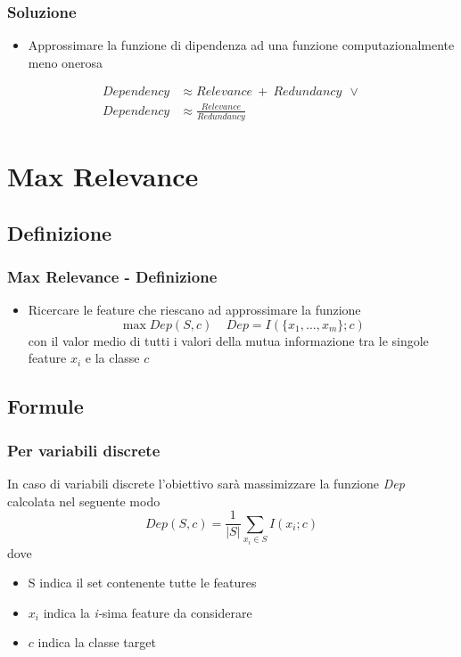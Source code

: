 \documentclass{beamer}
\begin{document}
\begin{frame}
	\frametitle{Soluzione}
	\begin{itemize}
		\item Approssimare la funzione di dipendenza ad una funzione computazionalmente meno onerosa
	\end{itemize}
	\begin{align*}
	Dependency &\approx Relevance ~ + ~ Redundancy ~~ \vee \\
	Dependency &\approx \frac{Relevance}{Redundancy}
	\end{align*}
\end{frame}


\section{Max Relevance}
\subsection{Definizione}
\begin{frame}
	\frametitle{Max Relevance - Definizione}
	\begin{itemize}
		\item Ricercare le feature che riescano ad approssimare la funzione 	$$ \max Dep(S,c)~~~~~ Dep = I(\{x_1,\dots,x_m \};c )$$
		con il valor medio di tutti i valori della mutua informazione tra le singole feature $x_i$ e la classe $c$
	\end{itemize}
\end{frame}
\subsection{Formule}
\begin{frame}
	\frametitle{Per variabili discrete}
	In caso di variabili discrete l'obiettivo sarà massimizzare la funzione \emph{Dep} calcolata nel seguente modo
	$$Dep(S,c)= \frac{1}{|S|} \sum\limits_{x_i \in S} I (x_i;c)$$
	dove 
	\begin{itemize}
		\item S indica il set contenente tutte le features
		\item $x_i$ indica la \emph{i-}sima feature da considerare
		\item $c$ indica la classe target
	\end{itemize}
\end{frame}
\end{document}

